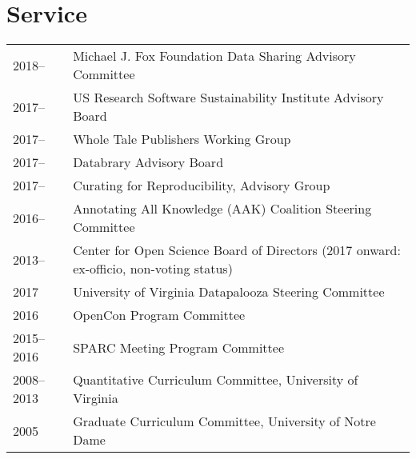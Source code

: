 \documentclass[11pt]{article}
\begin{document}
\section*{Service}
\begin{tabularx}{\textwidth}{lX}
2018--		& Michael J. Fox Foundation Data Sharing Advisory Committee\\
2017--		& US Research Software Sustainability Institute Advisory Board\\
2017--		& Whole Tale Publishers Working Group\\
2017--		& Databrary Advisory Board\\
2017--              	& Curating for Reproducibility, Advisory Group\\
2016--      		& Annotating All Knowledge (AAK) Coalition Steering Committee\\
2013--		& Center for Open Science Board of Directors (2017 onward: ex-officio, non-voting status)\\
2017			& University of Virginia Datapalooza Steering Committee\\
2016	      		& OpenCon Program Committee\\
2015--2016  	& SPARC Meeting Program Committee\\
2008--2013  	& Quantitative Curriculum Committee, University of Virginia\\
2005        		& Graduate Curriculum Committee, University of Notre Dame\\
\end{tabularx}
\end{document}
